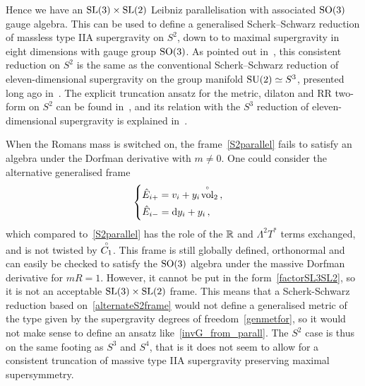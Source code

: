 \documentclass[debug]{phd}
\begin{document}
				Hence we have an $\mathrm{SL}(3)\times \mathrm{SL}(2)$ Leibniz parallelisation with associated $\mathrm{SO}(3)$ gauge algebra. 
				This can be used to define a generalised Scherk--Schwarz reduction of massless type IIA supergravity on $S^2$, down to to maximal supergravity in eight dimensions with gauge group $\mathrm{SO}(3)$. 
				As pointed out in~\cite{Boonstra:1998mp}, this consistent reduction on $S^2$ is the same as the conventional Scherk--Schwarz reduction of eleven-dimensional supergravity on the group manifold $\mathrm{SU}(2)\simeq S^3$, presented long ago in~\cite{Salam:1984ft}.
				The explicit truncation ansatz for the metric, dilaton and RR two-form on $S^2$ can be found in~\cite[sect.$\:$6]{Cvetic:2000dm}, and its relation with the $S^3$ reduction of eleven-dimensional supergravity is explained in~\cite{Cvetic:2003jy}.

 				When the Romans mass is switched on, the frame~\eqref{S2parallel} fails to satisfy an algebra under the Dorfman derivative with $m\neq 0$. One could consider the alternative generalised frame
						\begin{equation}\label{alternateS2frame}
							\begin{cases}
								\hat E_{i+} = v_i + y_i \!\stackrel{\scriptscriptstyle{\circ}}{\rm vol}_2\,, \\[1mm]
								\hat E_{i-} = \mathrm{d} y_i + y_i \,,
							\end{cases}
						\end{equation}
				which compared to~\eqref{S2parallel} has the role of the $\mathbb{R}$ and $\Lambda^2 T^*$ terms exchanged, and is not twisted by $\stackrel{\scriptscriptstyle{\circ}}{C_1}$.
				This frame is still globally defined, orthonormal and can easily be checked to satisfy the $\mathrm{SO}(3)$ algebra under the massive Dorfman derivative for $mR=1$. 
				However, it cannot be put in the form~\eqref{factorSL3SL2}, so it is not an acceptable $\mathrm{SL}(3)\times \mathrm{SL}(2)$ frame. 
				This means that a Scherk-Schwarz reduction based on~\eqref{alternateS2frame} would not define a generalised metric of the type given by the supergravity degrees of freedom~\eqref{genmetfor}, so it would not make sense to define an ansatz like~\eqref{invG_from_parall}.
				The $S^2$ case is thus on the same footing as $S^3$ and $S^4$, that is it does not seem to allow for a consistent truncation of massive type IIA supergravity preserving maximal supersymmetry.
\end{document}
